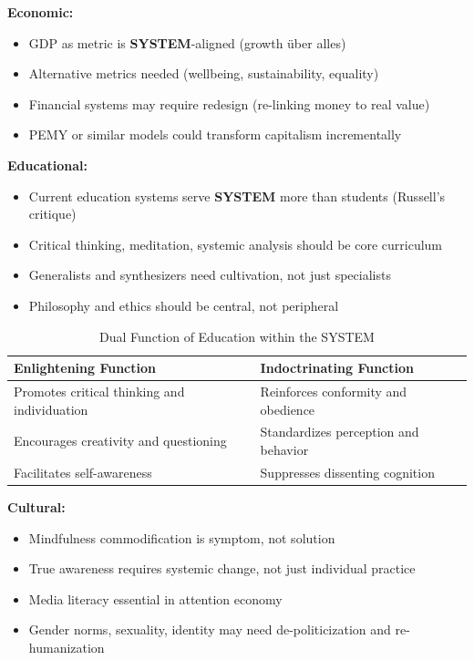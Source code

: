 \documentclass[11pt,a4paper]{article}
\newcommand{\SYSTEM}{\textbf{SYSTEM}}
\theoremstyle{definition}
\theoremstyle{remark}
\begin{document}
\textbf{Economic:}
\begin{itemize}
    \item GDP as metric is \SYSTEM{}-aligned (growth über alles)
    \item Alternative metrics needed (wellbeing, sustainability, equality)
    \item Financial systems may require redesign (re-linking money to real value)
    \item PEMY or similar models could transform capitalism incrementally
\end{itemize}

\textbf{Educational:}
\begin{itemize}
    \item Current education systems serve \SYSTEM{} more than students (Russell's critique)
    \item Critical thinking, meditation, systemic analysis should be core curriculum
    \item Generalists and synthesizers need cultivation, not just specialists
    \item Philosophy and ethics should be central, not peripheral
\end{itemize}

\begin{table}[h]
\centering
\caption{Dual Function of Education within the SYSTEM}
\label{tab:education_duality}
\begin{tabular}{|l|l|}
\hline
\textbf{Enlightening Function} & \textbf{Indoctrinating Function} \\ \hline
Promotes critical thinking and individuation & Reinforces conformity and obedience \\ \hline
Encourages creativity and questioning & Standardizes perception and behavior \\ \hline
Facilitates self-awareness & Suppresses dissenting cognition \\ \hline
\end{tabular}
\end{table}


\textbf{Cultural:}
\begin{itemize}
    \item Mindfulness commodification is symptom, not solution
    \item True awareness requires systemic change, not just individual practice
    \item Media literacy essential in attention economy
    \item Gender norms, sexuality, identity may need de-politicization and re-humanization
\end{itemize}
\end{document}
